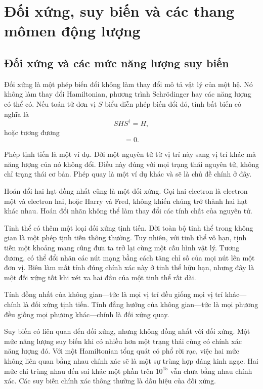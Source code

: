 \chapter{Đối xứng, suy biến và các thang mômen động lượng}
\providecommand{\ket}[1]{\left\lvert#1\right\rangle}

\section{Đối xứng và các mức năng lượng suy biến}

Đối xứng là một phép biến đổi không làm thay đổi mô tả vật lý của một hệ. Nó không làm thay đổi Hamiltonian, phương trình Schr\"odinger hay các năng lượng có thể có. Nếu toán tử đơn vị \(S\) biểu diễn phép biến đổi đó, tính bất biến có nghĩa là
\begin{equation}
S H S^\dagger=H,
\end{equation}
hoặc tương đương
\begin{equation}
[S,H]=0.
\end{equation}

Phép tịnh tiến là một ví dụ. Dời một nguyên tử từ vị trí này sang vị trí khác mà năng lượng của nó không đổi. Điều này đúng với mọi trạng thái nguyên tử, không chỉ trạng thái cơ bản. Phép quay là một ví dụ khác và sẽ là chủ đề chính ở đây.

Hoán đổi hai hạt đồng nhất cũng là một đối xứng. Gọi hai electron là electron một và electron hai, hoặc Harry và Fred, không khiến chúng trở thành hai hạt khác nhau. Hoán đổi nhãn không thể làm thay đổi các tính chất của nguyên tử.

Tinh thể có thêm một loại đối xứng tịnh tiến. Dời toàn bộ tinh thể trong không gian là một phép tịnh tiến thông thường. Tuy nhiên, với tinh thể vô hạn, tịnh tiến một khoảng mạng cũng đưa ta trở lại cùng một cấu hình vật lý. Tương đương, có thể đổi nhãn các nút mạng bằng cách tăng chỉ số của mọi nút lên một đơn vị. Biên làm mất tính đúng chính xác này ở tinh thể hữu hạn, nhưng đây là một đối xứng tốt khi xét xa hai đầu của một tinh thể rất dài.

Tính đồng nhất của không gian---tức là mọi vị trí đều giống mọi vị trí khác---chính là đối xứng tịnh tiến. Tính đẳng hướng của không gian---tức là mọi phương đều giống mọi phương khác---chính là đối xứng quay.

Suy biến có liên quan đến đối xứng, nhưng không đồng nhất với đối xứng. Một mức năng lượng suy biến khi có nhiều hơn một trạng thái cùng có chính xác năng lượng đó. Với một Hamiltonian tổng quát có phổ rời rạc, việc hai mức không liên quan bằng nhau chính xác sẽ là một sự trùng hợp đáng kinh ngạc. Hai mức chỉ trùng nhau đến sai khác một phần trên \(10^{15}\) vẫn chưa bằng nhau chính xác. Các suy biến chính xác thông thường là dấu hiệu của đối xứng.

